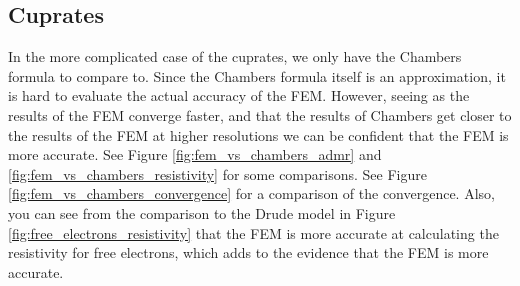 \documentclass[12pt]{article}
\begin{document}
\subsection{Cuprates}
In the more complicated case of the cuprates, we only have the Chambers formula to compare to.
Since the Chambers formula itself is an approximation, it is hard to evaluate the actual
accuracy of the FEM. However, seeing as the results of the FEM converge faster, and that the
results of Chambers get closer to the results of the FEM at higher resolutions we can be
confident that the FEM is more accurate. See Figure \ref{fig:fem_vs_chambers_admr} and
\ref{fig:fem_vs_chambers_resistivity} for some comparisons. See Figure
\ref{fig:fem_vs_chambers_convergence} for a comparison of the convergence. Also, you can see
from the comparison to the Drude model in Figure \ref{fig:free_electrons_resistivity} that the
FEM is more accurate at calculating the resistivity for free electrons, which adds to the
evidence that the FEM is more accurate.
\end{document}
